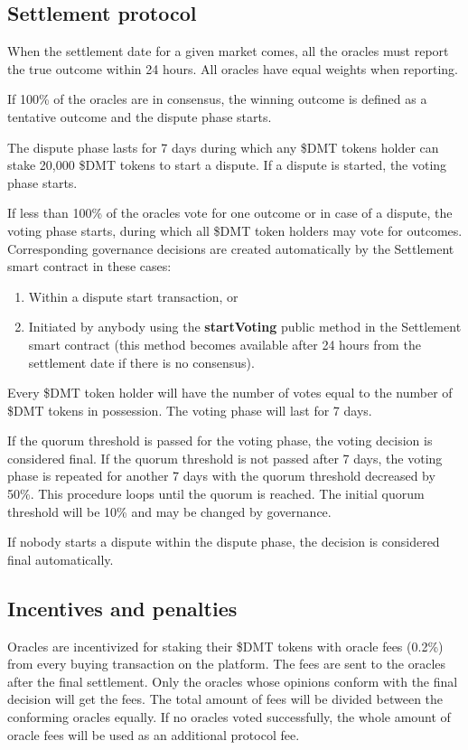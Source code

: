 \documentclass[12pt]{article}
\begin{document}
\subsection{Settlement protocol}
When the settlement date for a given market comes, all the oracles must report the true outcome within 24 hours. All oracles have equal weights when reporting.

If 100\% of the oracles are in consensus, the winning outcome is defined as a tentative outcome and the dispute phase starts.

The dispute phase lasts for 7 days during which any \$DMT tokens holder can stake 20,000 \$DMT tokens to start a dispute. If a dispute is started, the voting phase starts.

If less than 100\% of the oracles vote for one outcome or in case of a dispute, the voting phase starts, during which all \$DMT token holders may vote for outcomes. Corresponding governance decisions are created automatically by the Settlement smart contract in these cases:
\begin{enumerate}
\item Within a dispute start transaction, or
\item Initiated by anybody using the \textbf{startVoting} public method in the Settlement smart contract (this method becomes available after 24 hours from the settlement date if there is no consensus).
\end{enumerate}

Every \$DMT token holder will have the number of votes equal to the number of \$DMT tokens in possession. The voting phase will last for 7 days.

If the quorum threshold is passed for the voting phase, the voting decision is considered final. If the quorum threshold is not passed after 7 days, the voting phase is repeated for another 7 days with the quorum threshold decreased by 50\%. This procedure loops until the quorum is reached. The initial quorum threshold will be 10\% and may be changed by governance.

If nobody starts a dispute within the dispute phase, the decision is considered final automatically.

\subsection{Incentives and penalties}
Oracles are incentivized for staking their \$DMT tokens with oracle fees (0.2\%) from every buying transaction on the platform. The fees are sent to the oracles after the final settlement. Only the oracles whose opinions conform with the final decision will get the fees. The total amount of fees will be divided between the conforming oracles equally. If no oracles voted successfully, the whole amount of oracle fees will be used as an additional protocol fee.
\end{document}
